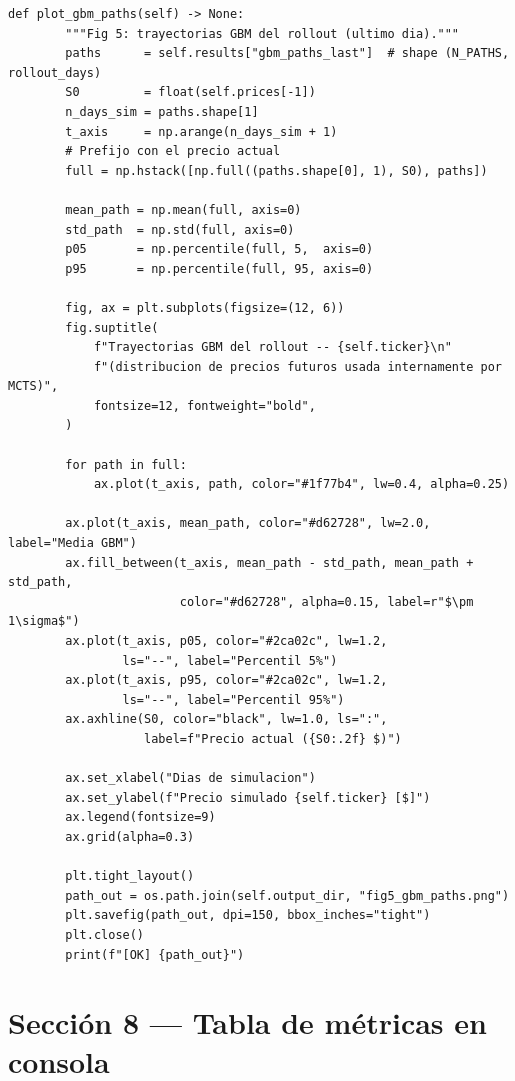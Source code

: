 \documentclass[12pt, a4paper]{article}
\begin{document}
\begin{lstlisting}[caption={Figura 5 -- visualizacion de trayectorias GBM}]
    def plot_gbm_paths(self) -> None:
        """Fig 5: trayectorias GBM del rollout (ultimo dia)."""
        paths      = self.results["gbm_paths_last"]  # shape (N_PATHS, rollout_days)
        S0         = float(self.prices[-1])
        n_days_sim = paths.shape[1]
        t_axis     = np.arange(n_days_sim + 1)
        # Prefijo con el precio actual
        full = np.hstack([np.full((paths.shape[0], 1), S0), paths])

        mean_path = np.mean(full, axis=0)
        std_path  = np.std(full, axis=0)
        p05       = np.percentile(full, 5,  axis=0)
        p95       = np.percentile(full, 95, axis=0)

        fig, ax = plt.subplots(figsize=(12, 6))
        fig.suptitle(
            f"Trayectorias GBM del rollout -- {self.ticker}\n"
            f"(distribucion de precios futuros usada internamente por MCTS)",
            fontsize=12, fontweight="bold",
        )

        for path in full:
            ax.plot(t_axis, path, color="#1f77b4", lw=0.4, alpha=0.25)

        ax.plot(t_axis, mean_path, color="#d62728", lw=2.0, label="Media GBM")
        ax.fill_between(t_axis, mean_path - std_path, mean_path + std_path,
                        color="#d62728", alpha=0.15, label=r"$\pm 1\sigma$")
        ax.plot(t_axis, p05, color="#2ca02c", lw=1.2,
                ls="--", label="Percentil 5%")
        ax.plot(t_axis, p95, color="#2ca02c", lw=1.2,
                ls="--", label="Percentil 95%")
        ax.axhline(S0, color="black", lw=1.0, ls=":",
                   label=f"Precio actual ({S0:.2f} $)")

        ax.set_xlabel("Dias de simulacion")
        ax.set_ylabel(f"Precio simulado {self.ticker} [$]")
        ax.legend(fontsize=9)
        ax.grid(alpha=0.3)

        plt.tight_layout()
        path_out = os.path.join(self.output_dir, "fig5_gbm_paths.png")
        plt.savefig(path_out, dpi=150, bbox_inches="tight")
        plt.close()
        print(f"[OK] {path_out}")
\end{lstlisting}

\section{Sección 8 --- Tabla de métricas en consola}
\end{document}
